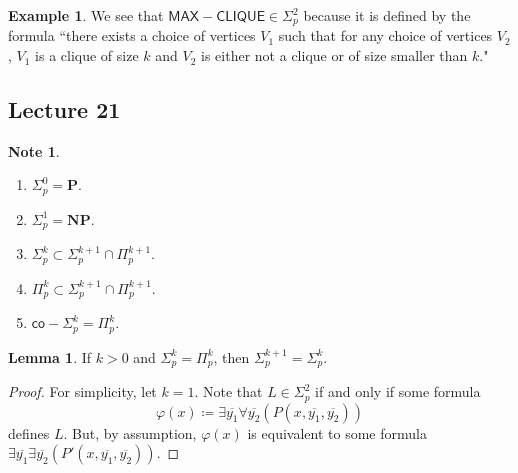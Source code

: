 \documentclass[10pt,letterpaper,cm]{nupset}
\theoremstyle{definition}
\newtheorem{exmp}[definition]{Example}
\newtheorem{note}[definition]{Note}
\theoremstyle{theorem}
\newtheorem{lemma}[definition]{Lemma}
\theoremstyle{remark}
\newcommand{\1}{\mathbf{1}}
\newcommand{\0}{\vec 0}
\begin{document}
\begin{exmp} 
We see that $\mathsf{MAX{-}CLIQUE} \in \Sigma^2_p$ because it is defined by the formula ``there exists a choice of vertices $V_1$ such that for any choice of vertices $V_2$, $V_1$ is a clique of size $k$ and $V_2$ is either not a clique or of size smaller than $k$."
\end{exmp}

\subsection{Lecture 21}

\begin{note} $ $
\begin{enumerate}
\item $\Sigma_p^0 = \mathbf{P}$.
\item $\Sigma_p^1 = \mathbf{NP} $.
\item $\Sigma^k_p \subset \Sigma^{k+1}_p \cap \Pi^{k+1}_p$.
\item $\Pi^k_p \subset \Sigma^{k+1}_p \cap \Pi^{k+1}_p$.
\item $\mathsf{co}{-}\Sigma^k_p = \Pi^k_p$. 
\end{enumerate}
\end{note}

\begin{lemma}
If $k>0$ and $\Sigma_p^k = \Pi^k_p$, then $\Sigma^{k+1}_p = \Sigma^k_p$.
\end{lemma}
\begin{proof}
For simplicity, let $k=1$. Note that $L \in \Sigma^2_p$ if and only if some formula $$\varphi(x)\coloneqq \exists{\overline{y_1}}\forall{\overline{y_2}}\left(P\left(x, \overline{y_1}, \overline{y_2}\right)\right)$$ defines $L$. But, by assumption, $\varphi(x)$ is equivalent to some formula  $ \exists{\overline{y_1}}\exists{\overline{y_2}}\left(P'\left(x, \overline{y_1}, \overline{y_2}\right)\right)$.
\end{proof}

\pagebreak
\end{document}

